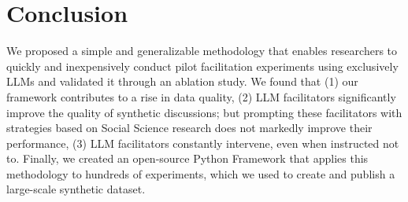 %
\section{Conclusion}

We proposed a simple and generalizable methodology that enables researchers to quickly and inexpensively conduct pilot facilitation experiments using exclusively LLMs and validated it through an ablation study. We found that (1) our framework contributes to a rise in data quality, (2) LLM facilitators significantly improve the quality of synthetic discussions; but prompting these facilitators with strategies based on Social Science research does not markedly improve their performance, (3) LLM facilitators constantly intervene, even when instructed not to. Finally, we created an open-source Python Framework that applies this methodology to hundreds of experiments, which we used to create and publish a large-scale synthetic dataset.